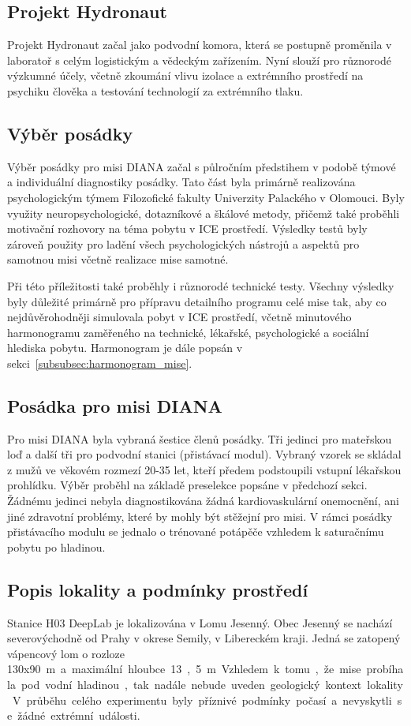 \subsection{Projekt Hydronaut}
\label{subsec:projekt_hydronaut}
Projekt Hydronaut začal jako podvodní komora, která se postupně proměnila v
laboratoř s celým logistickým a vědeckým zařízením. Nyní slouží pro různorodé
výzkumné účely, včetně zkoumání vlivu izolace a extrémního prostředí na psychiku
člověka a testování technologií za extrémního tlaku.

\subsection{Výběr posádky}
\label{subsec:vyber_posadky}
Výběr posádky pro misi DIANA začal s půlročním předstihem v podobě týmové a
individuální diagnostiky posádky. Tato část byla primárně realizována
psychologickým týmem Filozofické fakulty Univerzity Palackého v Olomouci. Byly
využity neuropsychologické, dotazníkové a škálové metody, přičemž také proběhli
motivační rozhovory na téma pobytu v ICE prostředí. Výsledky testů byly zároveň
použity pro ladění všech psychologických nástrojů a aspektů pro samotnou misi
včetně realizace mise samotné.

Při této příležitosti také proběhly i různorodé technické testy. Všechny
výsledky byly důležité primárně pro přípravu detailního programu celé mise tak,
aby co nejdůvěrohodněji simulovala pobyt v ICE prostředí, včetně minutového
harmonogramu zaměřeného na technické, lékařské, psychologické a sociální
hlediska pobytu. Harmonogram je dále popsán v sekci~\ref{subsubsec:harmonogram_mise}.

\subsection{Posádka pro misi DIANA}
Pro misi DIANA byla vybraná šestice členů posádky. Tři jedinci pro mateřskou loď
a další tři pro podvodní stanici (přistávací modul). Vybraný vzorek se skládal z
mužů ve věkovém rozmezí 20-35 let, kteří předem podstoupili vstupní lékařskou
prohlídku. Výběr proběhl na základě preselekce popsáne v předchozí sekci.
Žádnému jedinci nebyla diagnostikována žádná kardiovaskulární onemocnění, ani
jiné zdravotní problémy, které by mohly být stěžejní pro misi. V rámci posádky
přistávacího modulu se jednalo o trénované potápěče vzhledem k saturačnímu
pobytu po hladinou.

\subsection{Popis lokality a podmínky prostředí}
\label{subsec:diana_lokalita}
Stanice H03 DeepLab je lokalizována v Lomu Jesenný. Obec Jesenný se nachází
severovýchodně od Prahy v okrese Semily, v Libereckém kraji. Jedná se zatopený
vápencový lom o rozloze 130x90~\si\meter~a maximální hloubce 13,5~\si\meter.
Vzhledem k tomu, že mise probíhala pod vodní hladinou, tak nadále nebude uveden
geologický kontext lokality. V průběhu celého experimentu byly příznivé podmínky
počasí a nevyskytli se žádné extrémní události.

